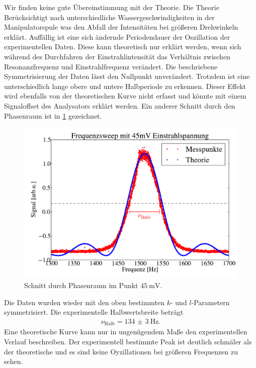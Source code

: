 \documentclass[paper=a4,
	fontsize=10pt,
	DIV=18,
	twocolumn,
	parskip=half
	]{scrartcl}
\numberwithin{equation}{section}    %
\begin{document}
Wir finden keine gute Übereinstimmung mit der Theorie.
Die Theorie Berücksichtigt nach \cite{anleitung} unterschiedliche Wassergeschwindigkeiten in der Manipulatorspule was den Abfall der Intensitäten bei größeren Drehwinkeln erklärt.
Auffällig ist eine sich ändernde Periodendauer der Oszillation der experimentellen Daten. 
Diese kann theoretisch nur erklärt werden, wenn sich während des Durchfahren der Einstrahlintensität das Verhältnis zwischen Resonanzfrequenz und Einstrahlfrequenz verändert.
Die beschriebene Symmetrisierung der Daten lässt den Nullpunkt unverändert. 
Trotzdem ist eine unterschiedlich lange obere und untere Halbperiode zu erkennen.
Dieser Effekt wird ebenfalls von der theoretischen Kurve nicht erfasst und könnte mit einem Signaloffset des Analysators erklärt werden.
Ein anderer Schnitt durch den Phasenraum ist in \cref{halbwertsbreite} gezeichnet.
\begin{figure}[htp]
	\begin{center}
		\includegraphics[width=\columnwidth]{Data-Plots/13-Halbwertsfrequenz.pdf}
		\caption{Schnitt durch Phasenraum im Punkt $\SI{45}{\milli\volt}$.}
		\label{halbwertsbreite}
	\end{center}
\end{figure}
Die Daten wurden wieder mit den oben bestimmten $k$- und $l$-Parametern symmetrisiert.
Die experimentelle Halbwertsbreite beträgt
\begin{align}
	\nu_\mathrm{Halb}= \SI{134(3)}{\hertz}.
\end{align}
Eine theoretische Kurve kann nur in ungenügendem Maße den experimentellen Verlauf beschreiben.
Der experimentell bestimmte Peak ist deutlich schmäler als der theoretische und es sind keine Oyzillationen bei größeren Frequenzen zu sehen.
\end{document}
